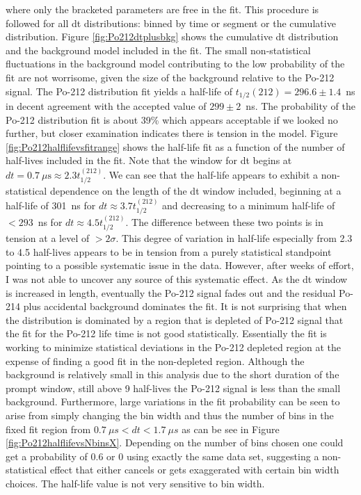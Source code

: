 where only the bracketed parameters are free in the fit. This procedure is followed for all dt distributions: binned by time or segment or the cumulative distribution. Figure \ref{fig:Po212dtplusbkg} shows the cumulative dt distribution and the background model included in the fit. The small non-statistical fluctuations in the background model contributing to the low probability of the fit are not worrisome, given the size of the background relative to the Po-212 signal. The Po-212 distribution fit yields a half-life of $t_{1/2}(212)=296.6\pm1.4$~ns in decent agreement with the accepted value of $299\pm2$~ns.  The probability of the Po-212 distribution fit is about 39\% which appears acceptable if we looked no further, but closer examination indicates there is tension in the model. Figure \ref{fig:Po212halflifevsfitrange} shows the half-life fit as a function of the number of half-lives included in the fit. Note that the window for dt begins at $dt=0.7~\mu\textrm{s}\approx2.3t_{1/2}^{(212)}$. We can see that the half-life appears to exhibit a non-statistical dependence on the length of the dt window included, beginning at a half-life of 301~ns for $dt\approx3.7t_{1/2}^{(212)}$ and decreasing to a minimum half-life of $<293$~ns for $dt\approx4.5t_{1/2}^{(212)}$. The difference between these two points is in tension at a level of $>2\sigma$. This degree of variation in half-life especially from 2.3 to 4.5 half-lives appears to be in tension from a purely statistical standpoint pointing to a possible systematic issue in the data. However, after weeks of effort, I was not able to uncover any source of this systematic effect. As the dt window is increased in length, eventually the Po-212 signal fades out and the residual Po-214 plus accidental background dominates the fit. It is not surprising that when the distribution is dominated by a region that is depleted of Po-212 signal that the fit for the Po-212 life time is not good statistically. Essentially the fit is working to minimize statistical deviations in the Po-212 depleted region at the expense of finding a good fit in the non-depleted region. Although the background is relatively small in this analysis due to the short duration of the prompt window, still above 9 half-lives the Po-212 signal is less than the small background. Furthermore, large variations in the fit probability can be seen to arise from simply changing the bin width and thus the number of bins in the fixed fit region from $0.7~\mu s<dt<1.7~\mu s$ as can be see in Figure \ref{fig:Po212halflifevsNbinsX}. Depending on the number of bins chosen one could get a probability of 0.6 or 0 using exactly the same data set, suggesting a non-statistical effect that either cancels or gets exaggerated with certain bin width choices. The half-life value is not very sensitive to bin width. 
